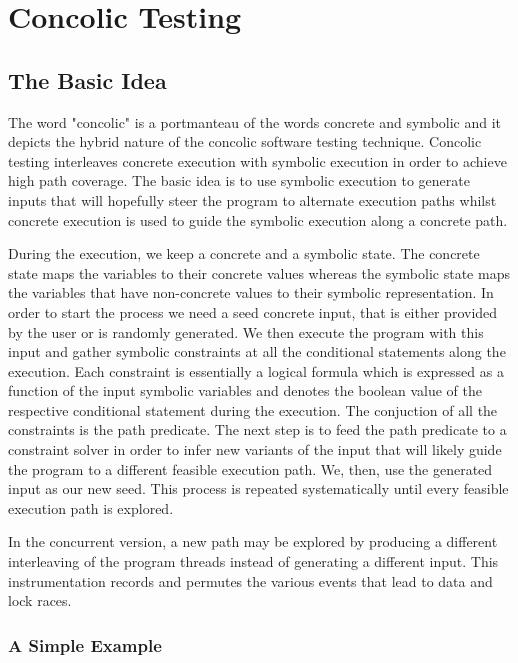 \chapter{Concolic Testing}\label{ch:concolic_testing}

\section{The Basic Idea}\label{sec:conc_basic_idea}

The word "concolic" is a portmanteau of the words concrete and symbolic and it
depicts the hybrid nature of the concolic software testing technique. Concolic testing
interleaves concrete execution with symbolic execution in order to achieve high
path coverage. The basic idea is to use symbolic execution to generate inputs
that will hopefully steer the program to alternate execution paths whilst
concrete execution is used to guide the symbolic execution along a concrete
path.

During the execution, we keep a concrete and a symbolic state. The concrete
state maps the variables to their concrete values whereas the symbolic state
maps the variables that have non-concrete values to their symbolic
representation. In order to start the process we need a seed concrete input,
that is either provided by the user or is randomly generated. We then execute
the program with this input and gather symbolic constraints at all the
conditional statements along the execution. Each constraint is essentially a
logical formula which is expressed as a function of the input symbolic
variables and denotes the boolean value of the respective conditional statement
during the execution. The conjuction of all the constraints is the path
predicate. The next step is to feed the path predicate to a constraint solver
in order to infer new variants of the input that will likely guide the program
to a different feasible execution path. We, then, use the generated input as
our new seed. This process is repeated systematically until every feasible
execution path is explored.

In the concurrent version, a new path may be explored by producing a different 
interleaving of the program threads instead of generating a different input. 
This instrumentation records and permutes the various events that lead to 
data and lock races.

\subsection{A Simple Example}\label{subsec:conc_simple_example}

